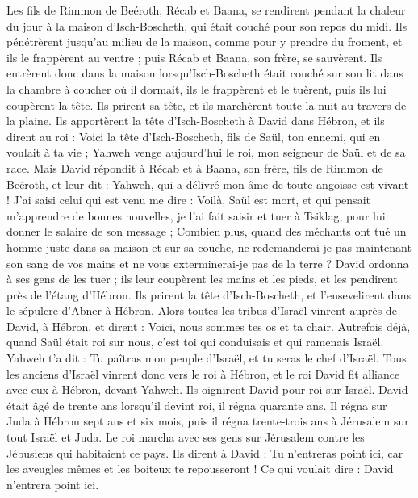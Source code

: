 \begin{multicols}{2}
Les fils de Rimmon de Beéroth, Récab et Baana, se rendirent pendant la chaleur du jour à la maison d'Isch-Boscheth, qui était couché pour son repos du midi.
Ils pénétrèrent jusqu'au milieu de la maison, comme pour y prendre du froment, et ils le frappèrent au ventre ; puis Récab et Baana, son frère, se sauvèrent.
Ils entrèrent donc dans la maison lorsqu’Isch-Boscheth était couché sur son lit dans la chambre à coucher où il dormait, ils le frappèrent et le tuèrent, puis ils lui coupèrent la tête. Ils prirent sa tête, et ils marchèrent toute la nuit au travers de la plaine.
Ils apportèrent la tête d'Isch-Boscheth à David dans Hébron, et ils dirent au roi : Voici la tête d'Isch-Boscheth, fils de Saül, ton ennemi, qui en voulait à ta vie ; Yahweh venge aujourd'hui le roi, mon seigneur de Saül et de sa race.
Mais David répondit à Récab et à Baana, son frère, fils de Rimmon de Beéroth, et leur dit : Yahweh, qui a délivré mon âme de toute angoisse est vivant !
J’ai saisi celui qui est venu me dire : Voilà, Saül est mort, et qui pensait m'apprendre de bonnes nouvelles, je l’ai fait saisir et tuer à Tsiklag, pour lui donner le salaire de son message ;
Combien plus, quand des méchants ont tué un homme juste dans sa maison et sur sa couche, ne redemanderai-je pas maintenant son sang de vos mains et ne vous exterminerai-je pas de la terre ?
David ordonna à ses gens de les tuer ; ils leur coupèrent les mains et les pieds, et les pendirent près de l'étang d'Hébron. Ils prirent la tête d'Isch-Boscheth, et l'ensevelirent dans le sépulcre d'Abner à Hébron.
\VerseOne{}Alors toutes les tribus d'Israël vinrent auprès de David, à Hébron, et dirent : Voici, nous sommes tes os et ta chair.
Autrefois déjà, quand Saül était roi sur nous, c’est toi qui conduisais et qui ramenais Israël. Yahweh t'a dit : Tu paîtras mon peuple d'Israël, et tu seras le chef d'Israël.
Tous les anciens d'Israël vinrent donc vers le roi à Hébron, et le roi David fit alliance avec eux à Hébron, devant Yahweh. Ils oignirent David pour roi sur Israël.
David était âgé de trente ans lorsqu’il devint roi, il régna quarante ans.
Il régna sur Juda à Hébron sept ans et six mois, puis il régna trente-trois ans à Jérusalem sur tout Israël et Juda.
Le roi marcha avec ses gens sur Jérusalem contre les Jébusiens qui habitaient ce pays. Ils dirent à David : Tu n'entreras point ici, car les aveugles mêmes et les boiteux te repousseront ! Ce qui voulait dire : David n'entrera point ici.

\end{multicols}
